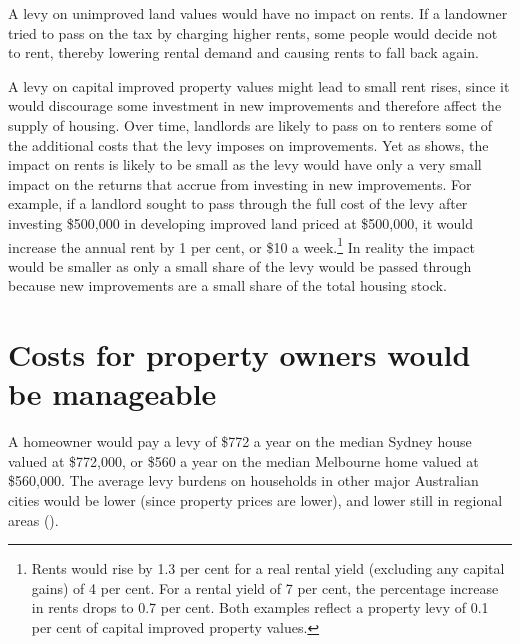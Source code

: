 \documentclass[twoside,english]{grattanBudgetRepairb5portrait}
\begin{document}
A levy on unimproved land values would have no impact on rents. If a landowner tried to pass on the tax by charging higher rents, some people would decide not to rent, thereby lowering rental demand and causing rents to fall back again.

A levy on capital improved property values might lead to small rent rises, since it would discourage some investment in new improvements and therefore affect the supply of housing. Over time, landlords are likely to pass on to renters some of the additional costs that the levy imposes on improvements. Yet as  shows, the impact on rents is likely to be small as the levy would have only a very small impact on the returns that accrue from investing in new improvements. For example, if a landlord sought to pass through the full cost of the levy after investing \$500,000 in developing improved land priced at \$500,000, it would increase the annual rent by 1 per cent, or \$10 a week.\footnote{Rents would rise by 1.3 per cent for a real rental yield (excluding any capital gains) of 4 per cent. For a rental yield of 7 per cent, the percentage increase in rents drops to 0.7 per cent. Both examples reflect a property levy of 0.1 per cent of capital improved property values.}  In reality the impact would be smaller as only a small share of the levy would be passed through because new improvements are a small share of the total housing stock.

\section{Costs for property owners would be manageable}
A homeowner would pay a levy of \$772 a year on the median Sydney house valued at \$772,000, or \$560 a year on the median Melbourne home valued at \$560,000. The average levy burdens on households in other major Australian cities would be lower (since property prices are lower), and lower still in regional areas (). 
\end{document}
